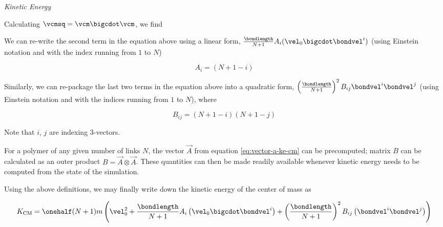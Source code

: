 \emph{Kinetic Energy}
\label{sec:calculation-kinetic-energy-cm-ke}
  \par Calculating $\vcmsq = \vcm \bigcdot \vcm$, we find
  
  \par We can re-write the second term in the equation above using a linear form, $\frac{\bondlength}{N+1} A_{i} (\vel_{0} \bigcdot \bondvel^{i})$ (using Einstein notation and with the index running from $1$ to $N$)
  \begin{tcolorbox}
    \begin{equation}
    \label{eq:vector-a-ke-cm}
      A_{i} = (N + 1 - i)
    \end{equation}
  \end{tcolorbox}
  \par Similarly, we can re-package the last two terms in the equation above into a quadratic form, $\left(\frac{\bondlength}{N+1}\right)^2 B_{ij} \bondvel^{i} \bondvel^{j}$ (using Einstein notation and with the indices running from $1$ to $N$), where
  \begin{tcolorbox}
    \begin{equation}
    \label{eq:matrix-ke-cm}
      B_{ij} = (N + 1 - i) (N + 1 - j)
    \end{equation}
  \end{tcolorbox}
  Note that $i$, $j$ are indexing 3-vectors.
  \par For a polymer of any given number of links $N$, the vector $\vec{A}$ from equation \ref{eq:vector-a-ke-cm} can be precomputed; matrix $B$ can be calculated as an outer product $B = \vec{A} \otimes \vec{A}$. These quantities can then be made readily available whenever kinetic energy needs to be computed from the state of the simulation.
  \par Using the above definitions, we may finally write down the kinetic energy of the center of mass as
  \begin{tcolorbox}
    \begin{equation}
    \label{eq:k-cm}
        K_{\textrm{CM}} = \onehalf (N+1)m
          \left(
            \vel^2_{0}
              + \frac{\bondlength}{N+1}
                  A_{i} \left(\vel_{0} \bigcdot \bondvel^{i}\right)
              + \left(\frac{\bondlength}{N+1}\right)^2
                B_{ij} \left(\bondvel^{i} \bondvel^{j}\right)
          \right)
    \end{equation}
  \end{tcolorbox}
